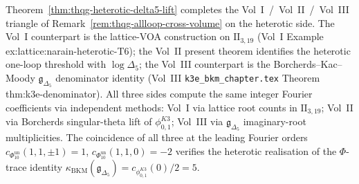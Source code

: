 \begin{remark}
\label{rem:thqg-heterotic-cross-volume-triangle}
Theorem~\ref{thm:thqg-heterotic-delta5-lift} completes the
Vol~I~/~Vol~II~/~Vol~III triangle of
Remark~\ref{rem:thqg-allloop-cross-volume} on the heterotic side.
The Vol~I counterpart is the lattice-VOA construction on
$\mathrm{II}_{3,19}$ \textup{(}Vol~I Example
\textup{ex:lattice:narain-heterotic-T6)}; the Vol~II present theorem
identifies the heterotic one-loop threshold with $\log\Delta_5$; the
Vol~III counterpart is the Borcherds--Kac--Moody
$\mathfrak{g}_{\Delta_5}$ denominator identity \textup{(}Vol~III
\texttt{k3e\_bkm\_chapter.tex} Theorem
\textup{thm:k3e-denominator)}. All three sides compute the same
integer Fourier coefficients via independent methods:
Vol~I via lattice root counts in $\mathrm{II}_{3,19}$;
Vol~II via Borcherds singular-theta lift of $\phi_{0,1}^{K3}$;
Vol~III via $\mathfrak{g}_{\Delta_5}$ imaginary-root multiplicities.
The coincidence of all three at the leading Fourier orders
$c_{\Phi_{10}^{\mathrm{un}}}(1, 1, \pm 1) = 1$,
$c_{\Phi_{10}^{\mathrm{un}}}(1, 1, 0) = -2$
verifies the heterotic realisation of the $\Phi$-trace
identity
$\kappa_{\mathrm{BKM}}(\mathfrak{g}_{\Delta_5})
=c_{\phi_{0,1}^{K3}}(0)/2=5$.
\end{remark}
